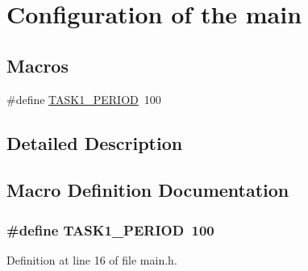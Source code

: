 \hypertarget{group__mainConfig}{\section{Configuration of the main}
\label{group__mainConfig}
}
\subsection*{Macros}
\begin{DoxyCompactItemize}
\item 
\#define \hyperlink{group__mainConfig_ga745f0e5078faacf33bffbc94239f62a9}{T\-A\-S\-K1\-\_\-\-P\-E\-R\-I\-O\-D}~100
\end{DoxyCompactItemize}


\subsection{Detailed Description}


\subsection{Macro Definition Documentation}
\hypertarget{group__mainConfig_ga745f0e5078faacf33bffbc94239f62a9}{
\subsubsection[{T\-A\-S\-K1\-\_\-\-P\-E\-R\-I\-O\-D}]{\setlength{\rightskip}{0pt plus 5cm}\#define T\-A\-S\-K1\-\_\-\-P\-E\-R\-I\-O\-D~100}}\label{group__mainConfig_ga745f0e5078faacf33bffbc94239f62a9}


Definition at line 16 of file main.\-h.

